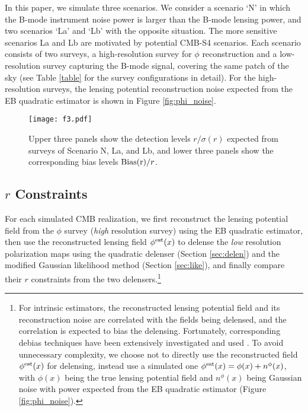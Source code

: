 \documentclass[aps, prd, reprint, nofootinbib, groupedaddress, showpacs]{revtex4-1}
\begin{document}
In this paper, we simulate three scenarios.
We consider a scenario `N' in which the B-mode instrument noise power
is larger than the B-mode lensing power, and two scenarios
`La' and `Lb' with the opposite situation.
The more sensitive scenarios La and Lb are motivated by potential CMB-S4 scenarios.
Each scenario consists of two surveys, a high-resolution survey for $\phi$ reconstruction
and a low-resolution survey capturing the B-mode signal, covering the same patch of the sky
(see Table \ref{table} for the survey configurations in detail).
For the high-resolution surveys, the lensing potential reconstruction noise
expected from the EB quadratic estimator \citep{Hu2001, Hu2002b,Anderes2013}
is shown in Figure \ref{fig:phi_noise}.


\begin{figure*}
\centering
\texttt{[image: f3.pdf]}
\caption{\label{fig:f3}
Upper three panels show the detection levels $r/\sigma(r)$ expected from surveys of Scenario N, La, and Lb,
and lower three panels show the corresponding bias levels ${\rm Bias(r)}/r$.}
\end{figure*}



\subsection{$r$ Constraints}
For each simulated CMB realization, we first reconstruct the lensing potential field from
the $\phi$ survey (\emph{high} resolution survey)
using the EB quadratic estimator,
then use the reconstructed lensing field $\phi^{\rm est}(x)$ to delense the
\emph{low} resolution polarization maps using the quadratic delenser (Section \ref{sec:delen})
and the modified Gaussian likelihood method (Section \ref{sec:like}),
and finally compare their $r$ constraints from the two delensers.\footnote{For intrinsic estimators,
the reconstructed lensing potential field and its reconstruction noise are
correlated with the fields being delensed, and the correlation is expected to bias
the delensing. Fortunately, corresponding debias techniques have been extensively investigated
and used \citep[see e.g.][]{Teng2011,Namikawa2015,Sehgal2016,Carron2017}.
To avoid unnecessary complexity, we choose not to directly use the reconstructed field
$\phi^{\rm est}(x)$ for delensing,
instead use a simulated one $\phi^{\rm est}(x) = \phi(x) + n^\phi(x)$,
with $\phi(x)$ being the true lensing potential field and $n^\phi(x)$ being Gaussian noise
with power expected from the EB quadratic estimator (Figure \ref{fig:phi_noise}).}
\end{document}
